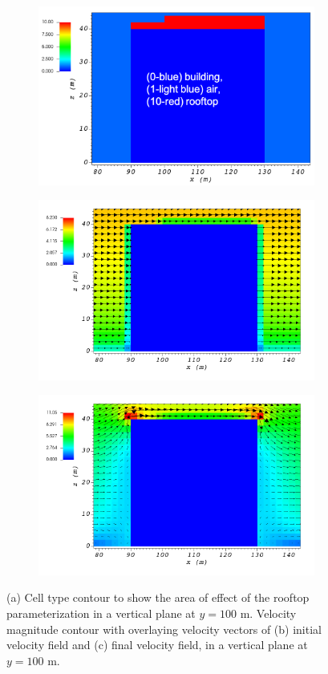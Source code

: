 \begin{figure}[H]
    \centering
    \begin{subfigure}{\textwidth}
    \centering
    \includegraphics[width=10.3cm,keepaspectratio]{Images/rooftop_y_100_1_init_icell.png}
    \caption{}
    \end{subfigure}
    \begin{subfigure}{\textwidth}
    \centering
    \includegraphics[width=11.0cm,keepaspectratio]{Images/rooftop_y_100_1_init_vel.png}
    \caption{}
    \end{subfigure}
    \begin{subfigure}{\textwidth}
    \centering
    \includegraphics[width=11.0cm,keepaspectratio]{Images/rooftop_y_100_1_final.png}
    \caption{}
    \end{subfigure}
    \caption{(a) Cell type contour to show the area of effect of the rooftop parameterization in a vertical plane at $y=100$ m. Velocity magnitude contour with overlaying velocity vectors of (b) initial velocity field and (c) final velocity field, in a vertical plane at $y=100$ m.}
\end{figure}

